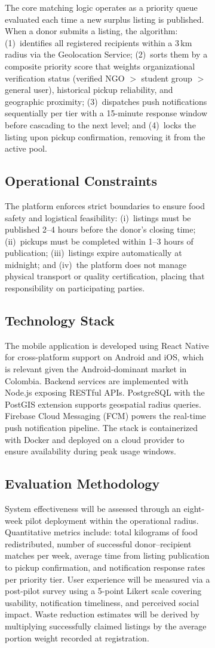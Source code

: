 \documentclass[conference]{IEEEtran}
\begin{document}
\begin{figure}[htbp]
\begin{figure}[htbp]
The core matching logic operates as a priority queue evaluated each time a new surplus listing is published. When a donor submits a listing, the algorithm: (1)~identifies all registered recipients within a 3\,km radius via the Geolocation Service; (2)~sorts them by a composite priority score that weights organizational verification status (verified NGO $>$ student group $>$ general user), historical pickup reliability, and geographic proximity; (3)~dispatches push notifications sequentially per tier with a 15-minute response window before cascading to the next level; and (4)~locks the listing upon pickup confirmation, removing it from the active pool.

\subsection{Operational Constraints}

The platform enforces strict boundaries to ensure food safety and logistical feasibility: (i)~listings must be published 2--4 hours before the donor's closing time; (ii)~pickups must be completed within 1--3 hours of publication; (iii)~listings expire automatically at midnight; and (iv)~the platform does not manage physical transport or quality certification, placing that responsibility on participating parties.

\subsection{Technology Stack}

The mobile application is developed using React Native for cross-platform support on Android and iOS, which is relevant given the Android-dominant market in Colombia. Backend services are implemented with Node.js exposing RESTful APIs. PostgreSQL with the PostGIS extension supports geospatial radius queries. Firebase Cloud Messaging (FCM) powers the real-time push notification pipeline. The stack is containerized with Docker and deployed on a cloud provider to ensure availability during peak usage windows.

\subsection{Evaluation Methodology}

System effectiveness will be assessed through an eight-week pilot deployment within the operational radius. Quantitative metrics include: total kilograms of food redistributed, number of successful donor--recipient matches per week, average time from listing publication to pickup confirmation, and notification response rates per priority tier. User experience will be measured via a post-pilot survey using a 5-point Likert scale covering usability, notification timeliness, and perceived social impact. Waste reduction estimates will be derived by multiplying successfully claimed listings by the average portion weight recorded at registration.


\end{figure}
\end{figure}
\end{document}
